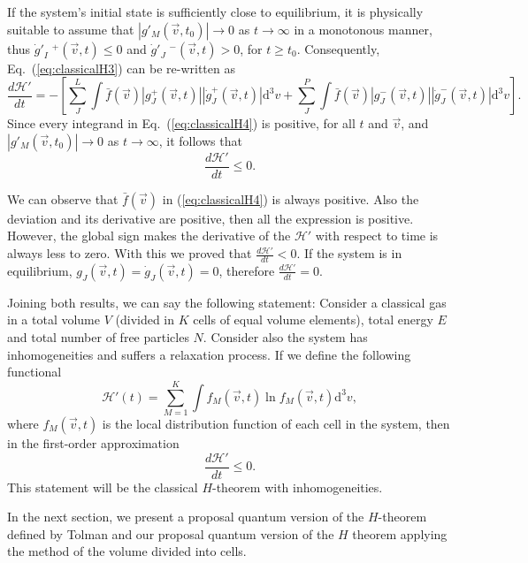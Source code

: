 %
If the system's initial state is sufficiently close to equilibrium, it is
physically suitable
to assume that $\left|g'_M(\vec{v},t_0)\right|\to 0$ as $t\to\infty$ in a monotonous manner,
thus ${{\dot{g}}'}_I\phantom{.}\!^{+}(\vec{v},t)\leq0$ and
${{\dot{g}}'}_J\phantom{.}\!^{-}(\vec{v},t)>0$, for $t\geq t_0$. Consequently,
Eq.~(\ref{eq:classicalH3}) can be re-written as
%
\begin{equation}\label{eq:classicalH4}
    \frac{d\mathcal{H}'}{dt}=-\left[
      \sum_J^{L}\int\bar f(\vec{v})|g_J^{+}(\vec{v},t)|
        |\dot g_J^{+}(\vec{v},t)|\mathrm{d}^3v
      +\sum_J^{P}\int\bar f(\vec{v})|g_J^{-}(\vec{v},t)|
      |\dot g_J^{-}(\vec{v},t)|\mathrm{d}^3v 
    \right].
\end{equation}
%
Since every integrand in Eq.~(\ref{eq:classicalH4}) is positive,
for all $t$ and $\vec v$, and
$\left|g'_M(\vec{v},t_0)\right|\to 0$ as $t\to\infty$, it follows that
%
\begin{equation}\label{eq:dHpdtleq0}
 \frac{d\mathcal{H}'}{dt}\leq0.
\end{equation}
%

We can observe that $\bar{f}(\vec{v})$ in (\ref{eq:classicalH4}) is always
positive. Also the deviation and its derivative are positive, then all the
expression is positive. However, the global sign makes the derivative of the
$\mathcal{H}'$ with respect to time is always less to zero. With this we proved that
$\frac{d\mathcal{H}'}{dt}<0$. If the system is in equilibrium,
$g_{J}(\vec{v},t)=\dot g_J(\vec{v},t)=0$, therefore $\frac{d\mathcal{H}'}{dt}=0$.


Joining both results, we can say the following statement:
Consider a classical gas in a total volume $V$ (divided in $K$ cells of equal
volume elements), total energy $E$ and total number of free particles $N$.
Consider also the system has inhomogeneities and suffers a relaxation process.
If we define the following functional
%
\begin{equation}\label{CH3}
   \mathcal{H}'(t)=\sum_{M=1}^{K}\int f_M(\vec{v},t) \ln f_M(\vec{v},t)\mathrm{d}^3v,
\end{equation}
%
where $f_M(\vec{v},t)$ is the local distribution function of each cell in the
system, then in the first-order approximation
%
\begin{equation}
    \frac{d\mathcal{H}'}{dt} \leq 0.
\end{equation}
%
This statement will be the classical $H$-theorem with inhomogeneities.

In the next section, we present a proposal quantum version of the
$H$-theorem defined by Tolman and our proposal quantum version of the $H$
theorem applying the method of the volume divided into cells.


